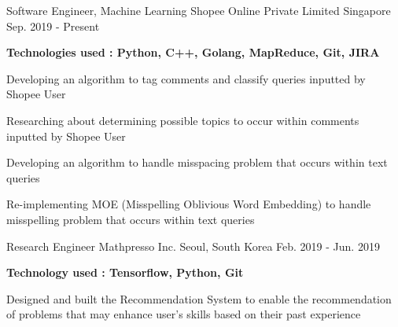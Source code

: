 \begin{cventries}
  \cventry
    {Software Engineer, Machine Learning}
    {Shopee Online Private Limited}
    {Singapore}
    {Sep. 2019 - Present}
    {
      \begin{cvitems}
        \item[] {\textbf {Technologies used : Python, C++, Golang, MapReduce, Git, JIRA} }
        \item {Developing an algorithm to tag comments and classify queries inputted by Shopee User}
        \item {Researching about determining possible topics to occur within comments inputted by Shopee User}
        \item {Developing an algorithm to handle misspacing problem that occurs within text queries}
        \item {Re-implementing MOE (Misspelling Oblivious Word Embedding) to handle misspelling problem that occurs within text queries}
      \end{cvitems}
    }
 
 
    \cventry
    {Research Engineer}
    {Mathpresso Inc.}
    {Seoul, South Korea}
    {Feb. 2019 - Jun. 2019}
    {
        \begin{cvitems}
			\item[]{\textbf {Technology used : Tensorflow, Python, Git}}
            \item {Designed and built the Recommendation System to enable the recommendation of problems that may enhance user's skills based on their past experience}
        \end{cvitems}
    }
    

\end{cventries}
